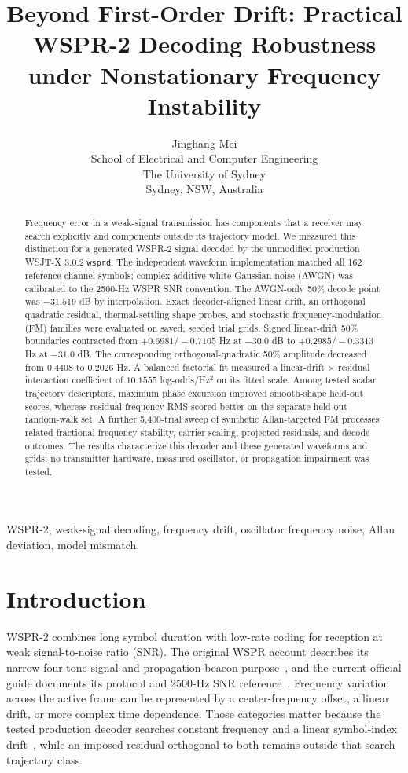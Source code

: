 \documentclass[conference]{IEEEtran}
\title{Beyond First-Order Drift: Practical WSPR-2 Decoding Robustness under Nonstationary Frequency Instability}
\author{Jinghang Mei\\
School of Electrical and Computer Engineering\\
The University of Sydney\\
Sydney, NSW, Australia}
\begin{document}
\maketitle

\begin{abstract}
Frequency error in a weak-signal transmission has components that a receiver may search explicitly and components outside its trajectory model. We measured this distinction for a generated WSPR-2 signal decoded by the unmodified production WSJT-X 3.0.2 \texttt{wsprd}. The independent waveform implementation matched all 162 reference channel symbols; complex additive white Gaussian noise (AWGN) was calibrated to the 2500-Hz WSPR SNR convention. The AWGN-only 50\% decode point was $-31.519$ dB by interpolation. Exact decoder-aligned linear drift, an orthogonal quadratic residual, thermal-settling shape probes, and stochastic frequency-modulation (FM) families were evaluated on saved, seeded trial grids. Signed linear-drift 50\% boundaries contracted from $+0.6981/-0.7105$ Hz at $-30.0$ dB to $+0.2985/-0.3313$ Hz at $-31.0$ dB. The corresponding orthogonal-quadratic 50\% amplitude decreased from $0.4408$ to $0.2026$ Hz. A balanced factorial fit measured a linear-drift $\times$ residual interaction coefficient of $10.1555$ log-odds/Hz$^2$ on its fitted scale. Among tested scalar trajectory descriptors, maximum phase excursion improved smooth-shape held-out scores, whereas residual-frequency RMS scored better on the separate held-out random-walk set. A further 5,400-trial sweep of synthetic Allan-targeted FM processes related fractional-frequency stability, carrier scaling, projected residuals, and decode outcomes. The results characterize this decoder and these generated waveforms and grids; no transmitter hardware, measured oscillator, or propagation impairment was tested.
\end{abstract}

\begin{IEEEkeywords}
WSPR-2, weak-signal decoding, frequency drift, oscillator frequency noise, Allan deviation, model mismatch.
\end{IEEEkeywords}

\section{Introduction}
WSPR-2 combines long symbol duration with low-rate coding for reception at weak signal-to-noise ratio (SNR). The original WSPR account describes its narrow four-tone signal and propagation-beacon purpose~\cite{taylor2010}, and the current official guide documents its protocol and 2500-Hz SNR reference~\cite{wsjtxguide}. Frequency variation across the active frame can be represented by a center-frequency offset, a linear drift, or more complex time dependence. Those categories matter because the tested production decoder searches constant frequency and a linear symbol-index drift~\cite{wsjtx302}, while an imposed residual orthogonal to both remains outside that search trajectory class.
\end{document}
